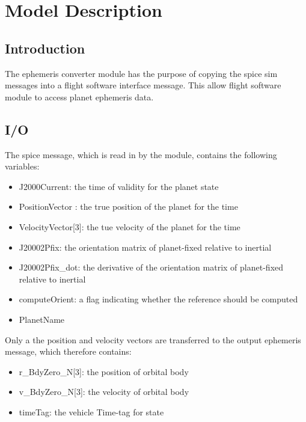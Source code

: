 \section{Model Description}

\subsection{Introduction}
The ephemeris converter module has the purpose of copying the spice sim messages into a flight software interface message. This allow flight software module to access planet ephemeris data.

\subsection{I/O}

The spice message, which is read in by the module, contains the following variables:

\begin{itemize}
\item J2000Current: the time of validity for the planet state
\item PositionVector : the true position of the planet for the time
    \item  VelocityVector[3]: the tue velocity of the planet for the time
    \item  J20002Pfix: the orientation matrix of planet-fixed relative to inertial
    \item  J20002Pfix\_dot: the derivative of the orientation matrix of planet-fixed relative to inertial
    \item  computeOrient: a flag indicating whether the reference should be computed
    \item  PlanetName
\end{itemize}

Only a the position and velocity vectors are transferred to the output ephemeris message, which therefore contains:
\begin{itemize}
    \item r\_BdyZero\_N[3]: the position of orbital body 
    \item v\_BdyZero\_N[3]: the velocity of orbital body
    \item timeTag: the vehicle Time-tag for state
\end{itemize}


